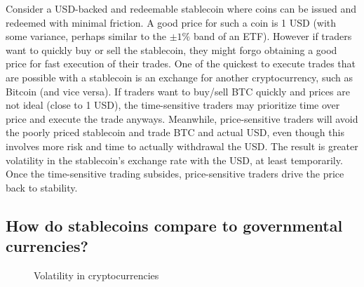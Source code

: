 Consider a USD-backed and redeemable stablecoin where coins can be issued and redeemed with minimal friction. A good price for such a coin is 1 USD (with some variance, perhaps similar to the $\pm 1\%$ band of an ETF). However if traders want to quickly buy or sell the stablecoin, they might forgo obtaining a good price for fast execution of their trades. One of the quickest to execute trades that are possible with a stablecoin is an exchange for another cryptocurrency, such as Bitcoin (and vice versa). If traders want to buy/sell BTC quickly and prices are not ideal (\ie close to 1 USD), the time-sensitive traders may prioritize time over price and execute the trade anyways. Meanwhile, price-sensitive traders will avoid the poorly priced stablecoin and trade BTC and actual USD, even though this involves more risk and time to actually withdrawal the USD. The result is greater volatility in the stablecoin's exchange rate with the USD, at least temporarily. Once the time-sensitive trading subsides, price-sensitive traders drive the price back to stability. 


\subsection{How do stablecoins compare to governmental currencies?}\label{sec:stability}


\begin{figure}[t!]
	\centering
	\hfill
	\caption{Volatility in cryptocurrencies}
	\label{fig:fiatandcrypto}
\end{figure}


